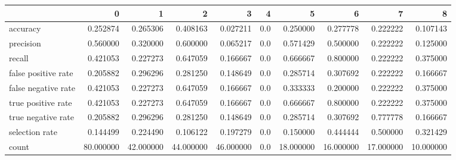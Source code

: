 \begin{tabular}{lrrrrrrrrr}
\toprule
{} &          0 &          1 &          2 &          3 &    4 &          5 &          6 &          7 &          8 \\
\midrule
accuracy            &   0.252874 &   0.265306 &   0.408163 &   0.027211 &  0.0 &   0.250000 &   0.277778 &   0.222222 &   0.107143 \\
precision           &   0.560000 &   0.320000 &   0.600000 &   0.065217 &  0.0 &   0.571429 &   0.500000 &   0.222222 &   0.125000 \\
recall              &   0.421053 &   0.227273 &   0.647059 &   0.166667 &  0.0 &   0.666667 &   0.800000 &   0.222222 &   0.375000 \\
false positive rate &   0.205882 &   0.296296 &   0.281250 &   0.148649 &  0.0 &   0.285714 &   0.307692 &   0.222222 &   0.166667 \\
false negative rate &   0.421053 &   0.227273 &   0.647059 &   0.166667 &  0.0 &   0.333333 &   0.200000 &   0.222222 &   0.375000 \\
true positive rate  &   0.421053 &   0.227273 &   0.647059 &   0.166667 &  0.0 &   0.666667 &   0.800000 &   0.222222 &   0.375000 \\
true negative rate  &   0.205882 &   0.296296 &   0.281250 &   0.148649 &  0.0 &   0.285714 &   0.307692 &   0.777778 &   0.166667 \\
selection rate      &   0.144499 &   0.224490 &   0.106122 &   0.197279 &  0.0 &   0.150000 &   0.444444 &   0.500000 &   0.321429 \\
count               &  80.000000 &  42.000000 &  44.000000 &  46.000000 &  0.0 &  18.000000 &  16.000000 &  17.000000 &  10.000000 \\
\bottomrule
\end{tabular}
